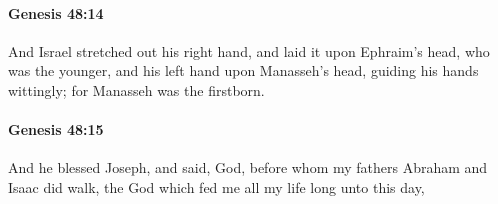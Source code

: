 		\paragraph{Genesis 48:14} %
			\label{GENESIS-48-14}

			And Israel stretched out his right hand, and laid it upon Ephraim's head, who was the younger, and his left hand upon Manasseh's head, guiding his hands wittingly; for Manasseh was the firstborn.


		\paragraph{Genesis 48:15} %
			\label{GENESIS-48-15}

			And he blessed Joseph, and said, God, before whom my fathers Abraham and Isaac did walk, the God which fed me all my life long unto this day,


